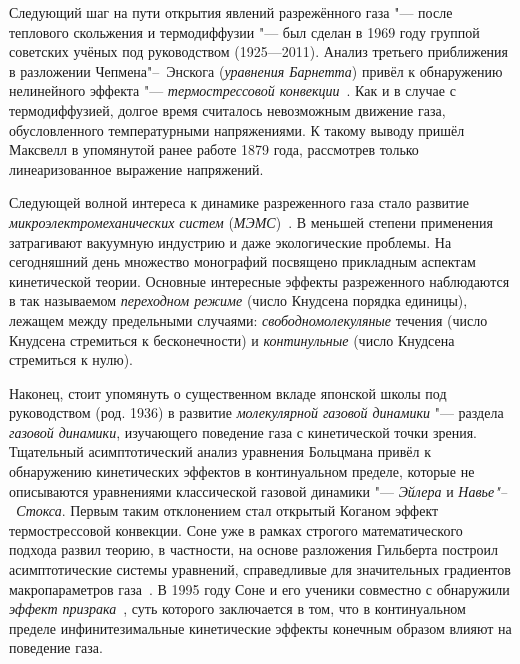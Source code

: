 \documentclass[a4paper, 12pt, oneside]{article} %
\begin{document}
Следующий шаг на пути открытия явлений разрежённого газа "---
после теплового скольжения и термодиффузии "--- был сделан в 1969 году
группой советских учёных под руководством 
(1925---2011). Анализ третьего приближения в разложении
Чепмена"--~Энскога (\emph{уравнения Барнетта}) привёл к обнаружению
нелинейного эффекта "--- \emph{термострессовой
конвекции}~\cite{kogan1976stresses}. Как и в случае с термодиффузией,
долгое время считалось невозможным движение газа, обусловленного
температурными напряжениями. К такому выводу пришёл Максвелл в
упомянутой ранее работе 1879 года, рассмотрев только линеаризованное
выражение напряжений.  

Следующей волной интереса к динамике разреженного газа стало развитие
\emph{микроэлектромеханических систем}
(\emph{МЭМС})~\cite{karniadakis2006microflows}. В меньшей степени
применения затрагивают вакуумную индустрию и даже экологические
проблемы. На сегодняшний день множество монографий посвящено прикладным
аспектам кинетической теории. Основные интересные эффекты разреженного
наблюдаются в так называемом \emph{переходном режиме} (число Кнудсена
порядка единицы), лежащем между предельными случаями:
\emph{свободномолекуляные} течения (число Кнудсена стремиться к
бесконечности) и \emph{континульные} (число Кнудсена стремиться к нулю).

Наконец, стоит упомянуть о существенном вкладе японской школы под
руководством  (род. 1936) в развитие
\emph{молекулярной газовой динамики} "--- раздела \emph{газовой
динамики}, изучающего поведение газа с кинетической точки зрения.
Тщательный асимптотический анализ уравнения Больцмана привёл к
обнаружению кинетических эффектов в континуальном пределе, которые не
описываются уравнениями классической газовой динамики "--- \emph{Эйлера}
и \emph{Навье"--~Стокса}. Первым таким отклонением стал открытый Коганом
эффект термострессовой конвекции. Соне уже в рамках строгого
математического подхода развил теорию, в частности, на основе разложения
Гильберта построил асимптотические системы уравнений, справедливые для
значительных градиентов макропараметров газа~\cite{sone2007molecular}. В
1995 году Соне и его ученики совместно с 
обнаружили \emph{эффект призрака}~\cite{sone1996ghost}, суть которого
заключается в том, что в континуальном пределе инфинитезимальные
кинетические эффекты конечным образом влияют на поведение газа.
\end{document}
